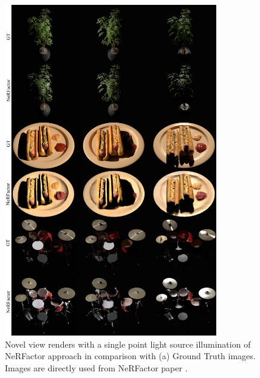 \begin{figure}[!htb]
    \centering
    \includegraphics[width=0.82\textwidth]{figures/concurrent/nerfactor_4_75percent.png}
    \caption{Novel view renders with a single point light source illumination of NeRFactor approach \cite{nerfactor}
    in comparison with (a) Ground Truth images.
    Images are directly used from NeRFactor paper \cite{nerfactor}.
    }
    \label{fig:concur_nerfactor2}
\end{figure}


